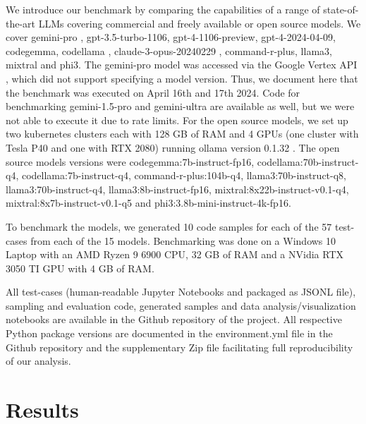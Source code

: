 \documentclass{ecai}
\begin{document}
We introduce our benchmark by comparing the capabilities of a range of state-of-the-art LLMs covering commercial and freely available or open source models. We cover gemini-pro \citep{geminiteam2024gemini}, gpt-3.5-turbo-1106, gpt-4-1106-preview, gpt-4-2024-04-09, codegemma, codellama \citep{roziere2024code}, claude-3-opus-20240229 \citep{anthropic2024claude}, command-r-plus, llama3, mixtral and phi3. The gemini-pro model was accessed via the Google Vertex API \citep{google2024vertex}, which did not support specifying a model version. Thus, we document here that the benchmark was executed on April 16th and 17th 2024. Code for benchmarking gemini-1.5-pro and gemini-ultra are available as well, but we were not able to execute it due to rate limits. For the open source models, we set up two kubernetes clusters each with 128 GB of RAM and 4 GPUs (one cluster with Tesla P40 and one with RTX 2080) running ollama version 0.1.32 \citep{ollama2024}. The open source models versions were codegemma:7b-instruct-fp16, codellama:70b-instruct-q4, codellama:7b-instruct-q4, command-r-plus:104b-q4, llama3:70b-instruct-q8, llama3:70b-instruct-q4, llama3:8b-instruct-fp16, mixtral:8x22b-instruct-v0.1-q4, mixtral:8x7b-instruct-v0.1-q5 and phi3:3.8b-mini-instruct-4k-fp16.

To benchmark the models, we generated 10 code samples for each of the 57 test-cases from each of the 15 models. Benchmarking was done on a Windows 10 Laptop with an AMD Ryzen 9 6900 CPU, 32 GB of RAM and a NVidia RTX 3050 TI GPU with 4 GB of RAM.

All test-cases (human-readable Jupyter Notebooks and packaged as JSONL file), sampling and evaluation code, generated samples and data analysis/visualization notebooks are available in the Github repository of the project. All respective Python package versions are documented in the environment.yml file in the Github repository and the supplementary Zip file facilitating full reproducibility of our analysis.





\section{Results}
\end{document}
